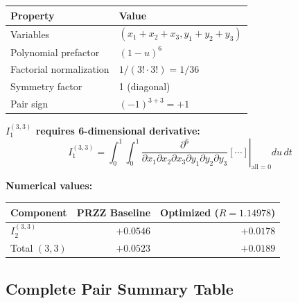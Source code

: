 \documentclass[11pt]{article}
\begin{document}
\begin{center}
\begin{tabular}{ll}
\toprule
Property & Value \\
\midrule
Variables & $(x_1+x_2+x_3, y_1+y_2+y_3)$ \\
Polynomial prefactor & $(1-u)^6$ \\
Factorial normalization & $1/(3! \cdot 3!) = 1/36$ \\
Symmetry factor & 1 (diagonal) \\
Pair sign & $(-1)^{3+3} = +1$ \\
\bottomrule
\end{tabular}
\end{center}

\textbf{$I_1^{(3,3)}$ requires 6-dimensional derivative:}
\begin{equation}
I_1^{(3,3)} = \int_0^1 \int_0^1 \left.\frac{\partial^6}{\partial x_1 \partial x_2 \partial x_3 \partial y_1 \partial y_2 \partial y_3}\left[\cdots\right]\right|_{\text{all}=0} du\, dt
\end{equation}

\textbf{Numerical values:}

\begin{center}
\begin{tabular}{lrr}
\toprule
Component & PRZZ Baseline & Optimized ($R=1.14978$) \\
\midrule
$I_2^{(3,3)}$ & $+0.0546$ & $+0.0178$ \\
Total $(3,3)$ & $+0.0523$ & $+0.0189$ \\
\bottomrule
\end{tabular}
\end{center}

\subsection{Complete Pair Summary Table}
\end{document}
